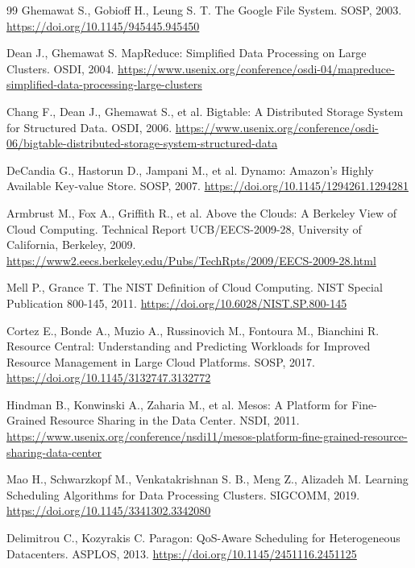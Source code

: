 \documentclass[UTF8]{ctexart}
\begin{document}
\begin{thebibliography}{99}
Ghemawat S., Gobioff H., Leung S. T. The Google File System. SOSP, 2003. \url{https://doi.org/10.1145/945445.945450}

Dean J., Ghemawat S. MapReduce: Simplified Data Processing on Large Clusters. OSDI, 2004. \url{https://www.usenix.org/conference/osdi-04/mapreduce-simplified-data-processing-large-clusters}

Chang F., Dean J., Ghemawat S., et al. Bigtable: A Distributed Storage System for Structured Data. OSDI, 2006. \url{https://www.usenix.org/conference/osdi-06/bigtable-distributed-storage-system-structured-data}

DeCandia G., Hastorun D., Jampani M., et al. Dynamo: Amazon's Highly Available Key-value Store. SOSP, 2007. \url{https://doi.org/10.1145/1294261.1294281}

Armbrust M., Fox A., Griffith R., et al. Above the Clouds: A Berkeley View of Cloud Computing. Technical Report UCB/EECS-2009-28, University of California, Berkeley, 2009. \url{https://www2.eecs.berkeley.edu/Pubs/TechRpts/2009/EECS-2009-28.html}

Mell P., Grance T. The NIST Definition of Cloud Computing. NIST Special Publication 800-145, 2011. \url{https://doi.org/10.6028/NIST.SP.800-145}

Cortez E., Bonde A., Muzio A., Russinovich M., Fontoura M., Bianchini R. Resource Central: Understanding and Predicting Workloads for Improved Resource Management in Large Cloud Platforms. SOSP, 2017. \url{https://doi.org/10.1145/3132747.3132772}

Hindman B., Konwinski A., Zaharia M., et al. Mesos: A Platform for Fine-Grained Resource Sharing in the Data Center. NSDI, 2011. \url{https://www.usenix.org/conference/nsdi11/mesos-platform-fine-grained-resource-sharing-data-center}

Mao H., Schwarzkopf M., Venkatakrishnan S. B., Meng Z., Alizadeh M. Learning Scheduling Algorithms for Data Processing Clusters. SIGCOMM, 2019. \url{https://doi.org/10.1145/3341302.3342080}

Delimitrou C., Kozyrakis C. Paragon: QoS-Aware Scheduling for Heterogeneous Datacenters. ASPLOS, 2013. \url{https://doi.org/10.1145/2451116.2451125}


\end{thebibliography}
\end{document}
